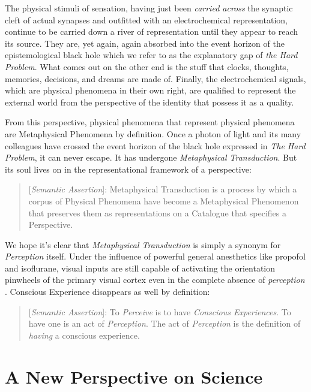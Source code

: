 \documentclass[runningheads]{llncs}
\begin{document}
The physical stimuli of sensation, having just been \emph{carried across} the synaptic cleft of actual synapses and outfitted with an electrochemical representation, continue to be carried down a river of representation until they appear to reach its source. They are, yet again, again absorbed into the event horizon of the epistemological black hole which we refer to as the explanatory gap of \emph{the Hard Problem}. What comes out on the other end is the stuff that clocks, thoughts, memories, decisions, and dreams are made of. Finally, the electrochemical signals, which are physical phenomena in their own right, are qualified to represent the external world from the perspective of the identity that possess it as a quality.

From this perspective, physical phenomena that represent physical phenomena are Metaphysical Phenomena by definition. Once a photon of light and its many colleagues have crossed the event horizon of the black hole expressed in \emph{The Hard Problem}, it can never escape. It has undergone \emph{Metaphysical Transduction}. But its soul lives on in the representational framework of a perspective:

\begin{quote}
[\emph{Semantic Assertion}]: Metaphysical Transduction is a process by which a corpus of Physical Phenomena have become a Metaphysical Phenomenon that preserves them as representations on a Catalogue that specifies a Perspective.
\end{quote}

We hope it's clear that \emph{Metaphysical Transduction} is simply a synonym for \emph{Perception} itself. Under the influence of powerful general anesthetics like propofol and isoflurane, visual inputs are still capable of activating the orientation pinwheels of the primary visual cortex even in the complete absence of \emph{perception}\cite{Bugrova2020} \cite{Khan2024}. Conscious Experience disappears as well by definition:

\begin{quote}
[\emph{Semantic Assertion}]: To \emph{Perceive} is to have \emph{Conscious Experiences}. To have one is an act of \emph{Perception}. The act of \emph{Perception} is the definition of \emph{having} a conscious experience.
\end{quote}

\section{A New Perspective on Science}
\end{document}
